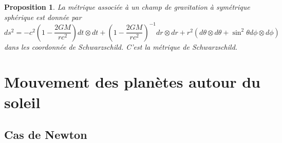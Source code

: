 \documentclass[a4paper,11pt]{report}
\theoremstyle{definition}
\theoremstyle{plain}
\newtheorem{prop}[thm]{Proposition}
\theoremstyle{definition}
\theoremstyle{remark}
\begin{document}
        \begin{prop}
            La métrique associée à un champ de gravitation à symétrique sphérique est donnée par
            \begin{equation}
                ds^2 = -c^2\left( 1-\frac{2GM}{rc^2} \right)dt\otimes dt + \left( 1-\frac{2GM}{rc^2} \right)^{-1}dr\otimes dr + r^2(d\theta\otimes d\theta+\sin^2\theta d\phi\otimes d\phi)
            \end{equation}
            dans les coordonnée de Schwarzschild. C'est la \textit{métrique de Schwarzschild}.
        \end{prop}

    \section{Mouvement des planètes autour du soleil}
    
        \subsection{Cas de Newton}
        
\end{document}
